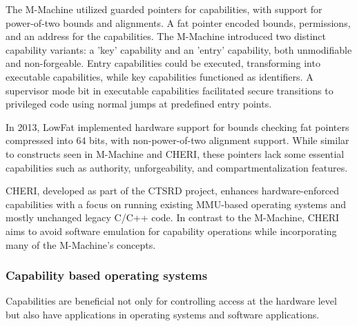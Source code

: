 The M-Machine utilized guarded pointers for capabilities, with support for 
power-of-two bounds and alignments. A fat pointer encoded bounds, permissions, 
and an address for the capabilities. The M-Machine introduced two distinct 
capability variants: a 'key' capability and an 'entry' capability, both 
unmodifiable and non-forgeable. Entry capabilities could be executed, 
transforming into executable capabilities, while key capabilities 
functioned as identifiers. A supervisor mode bit in executable capabilities 
facilitated secure transitions to privileged code using normal jumps at predefined entry points.

In 2013, LowFat implemented hardware support for bounds checking fat pointers compressed into 
64 bits, with non-power-of-two alignment support. While similar to constructs seen in 
M-Machine and CHERI, these pointers lack some essential capabilities such as authority, 
unforgeability, and compartmentalization features.


CHERI, developed as part of the CTSRD project, enhances hardware-enforced capabilities 
with a focus on running existing MMU-based operating systems and mostly unchanged 
legacy C/C++ code. In contrast to the M-Machine, CHERI aims to avoid software 
emulation for capability operations while incorporating many of the M-Machine's concepts.

\subsubsection{Capability based operating systems}
Capabilities are beneficial not only for controlling access at the hardware level but also 
have applications in operating systems and software applications.



